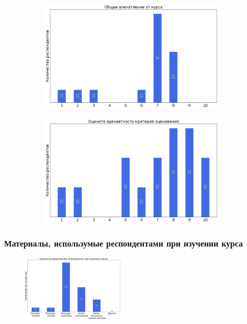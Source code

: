 		\begin{figure}[H]
			\centering
			\begin{subfigure}[b]{0.45\textwidth}
				\centering
				\includegraphics[width=\textwidth]{images/4 course/Защита информации/general-0.png}
			\end{subfigure}
			\begin{subfigure}[b]{0.45\textwidth}
				\centering
				\includegraphics[width=\textwidth]{images/4 course/Защита информации/general-1.png}
			\end{subfigure}	
		\end{figure}

	\subsubsection{Материалы, использумые респондентами при изучении курса}

		\begin{figure}[H]
			\centering
			\includegraphics[width = 0.45\textwidth]{images/4 course/Защита информации/materials.png}
		\end{figure}



